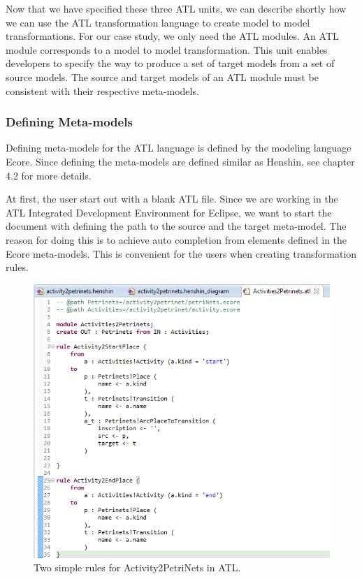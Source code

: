 Now that we have specified these three ATL units, we can describe shortly how
we can use the ATL transformation language to create model to model
transformations. For our case study, we only need the ATL modules. An ATL module
corresponds to a model to model transformation. This unit enables developers to
specify the way to produce a set of target models from a set of source models.
The source and target models of an ATL module must be consistent with their
respective meta-models. 

\subsubsection*{Defining Meta-models}

Defining meta-models for the ATL language is defined by the modeling language
Ecore. Since defining the meta-models are defined similar as Henshin, see
chapter 4.2 for more details. 

At first, the user start out with a blank ATL file. Since we are working in
the ATL Integrated Development Environment for Eclipse, we want to start the
document with defining the path to the source and the target meta-model. The
reason for doing this is to achieve auto completion from elements defined in the
Ecore meta-models. This is convenient for the users when creating transformation
rules.  

\begin{figure}[H]
	\centering
	\includegraphics[scale=0.5]{figures/ATLScreen.png}
	\caption[Simple rules for ATL]
	{Two simple rules for Activity2PetriNets in ATL.}
	\label{fig:ATL_Screen}
\end{figure}

